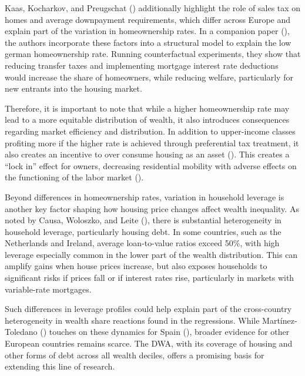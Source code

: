 \documentclass[
  a4paper,
  DIV=11,
  numbers=noendperiod]{scrartcl}
\begin{document}
Kaas, Kocharkov, and Preugschat
()
additionally highlight the role of sales tax on homes and average
downpayment requirements, which differ across Europe and explain part of
the variation in homeownership rates. In a companion paper
(), the
authors incorporate these factors into a structural model to explain the
low german homeownership rate. Running counterfactual experiments, they
show that reducing transfer taxes and implementing mortgage interest
rate deductions would increase the share of homeowners, while reducing
welfare, particularly for new entrants into the housing market.

Therefore, it is important to note that while a higher homeownership
rate may lead to a more equitable distribution of wealth, it also
introduces consequences regarding market efficiency and distribution. In
addition to upper-income classes profiting more if the higher rate is
achieved through preferential tax treatment, it also creates an
incentive to over consume housing as an asset
(). This
creates a ``lock in'' effect for owners, decreasing residential mobility
with adverse effects on the functioning of the labor market
().

Beyond differences in homeownership rates, variation in household
leverage is another key factor shaping how housing price changes affect
wealth inequality. As noted by Causa, Woloszko, and Leite
(), there is
substantial heterogeneity in household leverage, particularly housing
debt. In some countries, such as the Netherlands and Ireland, average
loan-to-value ratios exceed 50\%, with high leverage especially common
in the lower part of the wealth distribution. This can amplify gains
when house prices increase, but also exposes households to significant
risks if prices fall or if interest rates rise, particularly in markets
with variable-rate mortgages.

Such differences in leverage profiles could help explain part of the
cross-country heterogeneity in wealth share reactions found in the
regressions. While Martínez-Toledano
() touches on
these dynamics for Spain
(),
broader evidence for other European countries remains scarce. The DWA,
with its coverage of housing and other forms of debt across all wealth
deciles, offers a promising basis for extending this line of research.
\end{document}
